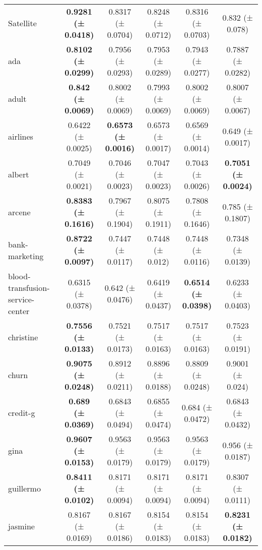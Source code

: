\documentclass[11pt]{article}
\begin{document}
\begin{table}[h]
{\begin{tabular}{@{}lccccc@{}}
Satellite              & \textbf{0.9281 (± 0.0418)} & 0.8317 (± 0.0704)          & 0.8248 (± 0.0712) & 0.8316 (± 0.0703) & 0.832 (± 0.078)            \\
ada                    & \textbf{0.8102 (± 0.0299)} & 0.7956 (± 0.0293)          & 0.7953 (± 0.0289) & 0.7943 (± 0.0277) & 0.7887 (± 0.0282)          \\
adult                  & \textbf{0.842 (± 0.0069)}  & 0.8002 (± 0.0069)          & 0.7993 (± 0.0069) & 0.8002 (± 0.0069) & 0.8007 (± 0.0067)          \\
airlines               & 0.6422 (± 0.0025)          & \textbf{0.6573 (± 0.0016)} & 0.6573 (± 0.0017) & 0.6569 (± 0.0014) & 0.649 (± 0.0017)           \\
albert                 & 0.7049 (± 0.0021)          & 0.7046 (± 0.0023)          & 0.7047 (± 0.0023) & 0.7043 (± 0.0026) & \textbf{0.7051 (± 0.0024)} \\
arcene                 & \textbf{0.8383 (± 0.1616)} & 0.7967 (± 0.1904)          & 0.8075 (± 0.1911) & 0.7808 (± 0.1646) & 0.785 (± 0.1807)           \\
bank-marketing         & \textbf{0.8722 (± 0.0097)} & 0.7447 (± 0.0117)          & 0.7448 (± 0.012)  & 0.7448 (± 0.0116) & 0.7348 (± 0.0139)          \\
blood-transfusion-service-center & 0.6315 (± 0.0378)          & 0.642 (± 0.0476)  & 0.6419 (± 0.0437) & \textbf{0.6514 (± 0.0398)} & 0.6233 (± 0.0403) \\
christine              & \textbf{0.7556 (± 0.0133)} & 0.7521 (± 0.0173)          & 0.7517 (± 0.0163) & 0.7517 (± 0.0163) & 0.7523 (± 0.0191)          \\
churn                  & \textbf{0.9075 (± 0.0248)} & 0.8912 (± 0.0211)          & 0.8896 (± 0.0188) & 0.8809 (± 0.0248) & 0.9001 (± 0.024)           \\
credit-g               & \textbf{0.689 (± 0.0369)}  & 0.6843 (± 0.0494)          & 0.6855 (± 0.0474) & 0.684 (± 0.0472)  & 0.6843 (± 0.0432)          \\
gina                   & \textbf{0.9607 (± 0.0153)} & 0.9563 (± 0.0179)          & 0.9563 (± 0.0179) & 0.9563 (± 0.0179) & 0.956 (± 0.0187)           \\
guillermo              & \textbf{0.8411 (± 0.0102)} & 0.8171 (± 0.0094)          & 0.8171 (± 0.0094) & 0.8171 (± 0.0094) & 0.8307 (± 0.0111)          \\
jasmine                & 0.8167 (± 0.0169)          & 0.8167 (± 0.0186)          & 0.8154 (± 0.0183) & 0.8154 (± 0.0183) & \textbf{0.8231 (± 0.0182)} \\

\end{tabular}}
\end{table}
\end{document}
